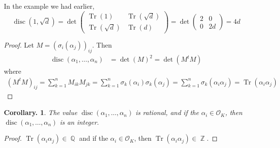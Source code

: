 \documentclass[11pt, a4paper]{memoir}
\DeclareMathOperator{\Q}{{\mathbb{Q}}}
\DeclareMathOperator{\Z}{{\mathbb{Z}}}
\theoremstyle{change}
\newtheorem{corollary}[theorem]{Corollary.}
\theoremstyle{plain}
\theoremstyle{nonumberplain}
\newtheorem{proof}{Proof}
\DeclareMathOperator{\disc}{disc}
\DeclareMathOperator{\Tr}{Tr}
\numberwithin{equation}{section}
\begin{document}
In the example we had earlier,
\begin{equation*}
    \disc(1,\sqrt{d})=\det\begin{pmatrix}\Tr(1)&\Tr(\sqrt{d})\\\Tr(\sqrt{d})&\Tr(d)\end{pmatrix}=\det\begin{pmatrix}2&0\\0&2d\end{pmatrix}=4d
\end{equation*}
\begin{proof}
    Let $M=(\sigma_i(\alpha_j))_{ij}$.
    Then
    \begin{align*}
        \disc(\alpha_1,\ldots,\alpha_n) &= \det(M)^2 = \det(M^tM)
    \end{align*}
    where
    \begin{align*}
        \left(M^tM\right)_{ij} =\sum_{k=1}^n M_{ik}M_{jk}=\sum_{k=1}^n\sigma_k(\alpha_i)\sigma_k(\alpha_j)=\sum_{k=1}^n\sigma_k(\alpha_i\alpha_j)=\Tr(\alpha_i\alpha_j)
    \end{align*}
\end{proof}
\begin{corollary}
    The value $\disc(\alpha_1,\ldots,\alpha_n)$ is rational, and if the $\alpha_i\in\mathcal{O}_K$, then $\disc(\alpha_1,\ldots,\alpha_n)$ is an integer.
\end{corollary}
\begin{proof}
    $\Tr(\alpha_i\alpha_j)\in\Q$ and if the $\alpha_i\in\mathcal{O}_K$, then $\Tr(\alpha_i\alpha_j)\in\Z$.
\end{proof}
\end{document}
